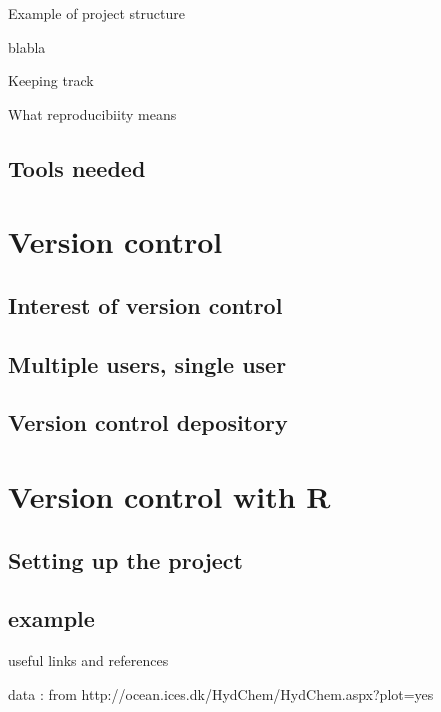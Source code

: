\begin{frame}{Example of project structure}
    
    blabla
    
\end{frame}


\begin{frame}{Keeping track}
    
    What reproducibiity means
    
\end{frame}




    \subsection{Tools needed}





\section{Version control}



    \subsection{Interest of version control}
    
    
    
    \subsection{Multiple users, single user}
    
    
    
    \subsection{Version control depository}


\section{Version control with R}

\subsection{Setting up the project}

\subsection{example}



\begin{frame}
    
    useful links and references
    
\end{frame}

data : from http://ocean.ices.dk/HydChem/HydChem.aspx?plot=yes


